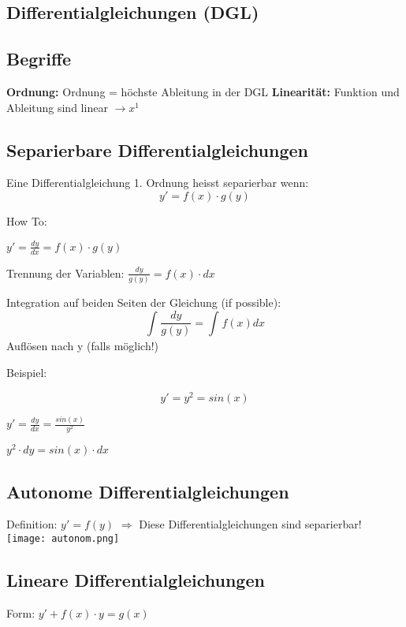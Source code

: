 \begin{multicols*}{3}
    \vfill\null
    \columnbreak
    \section{Differentialgleichungen (DGL)}
    \subsection{Begriffe}
    {\textbf{Ordnung:} Ordnung = höchste Ableitung in der DGL}
    {\textbf{Linearität:} Funktion und Ableitung sind linear $\rightarrow x^1$ }

    \subsection{Separierbare Differentialgleichungen}
    {Eine Differentialgleichung 1. Ordnung heisst separierbar wenn:}
    $$ y' = f(x)\cdot g(y)$$

    {How To:}

    $y' = \frac{dy}{dx} = f(x)\cdot g(y) $

     {Trennung der Variablen:} $\frac{dy}{g(y)} = f(x)\cdot dx$

     {Integration auf beiden Seiten der Gleichung (if possible):} $$\int_{}^{}{\frac{dy}{g(y)}=\int_{}^{}f(x)dx}$$
     {Auflösen nach y (falls möglich!)}

    \begin{multicols}{2}
        {Beispiel:}

        $$y' = y^2 = sin(x)$$

         $y' = \frac{dy}{dx}=\frac{sin(x)}{y^2}$

         $y^2\cdot dy = sin(x)\cdot dx $
        \columnbreak



    \end{multicols}



    \subsection{Autonome Differentialgleichungen}
    {Definition: $y' = f(y)$}
    {$\Rightarrow$ Diese Differentialgleichungen sind separierbar!}
    \texttt{[image: autonom.png]}
    \vfill\null
    \columnbreak
    \subsection{ Lineare Differentialgleichungen}
    {\large Form: $y' + f(x) \cdot y = g(x)$}


\end{multicols*}
